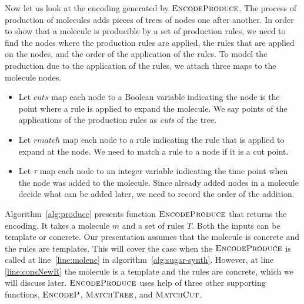 Now let us look at the encoding generated by $\textsc{EncodeProduce}$.
The process of production of molecules adds pieces of trees of nodes
one after another.
In order to show that a molecule is producible by a set of production rules,
we need to find the nodes where the production rules are applied,
the rules that are applied on the nodes, and
the order of the application of the rules.
To model the production due to the application of the rules,
we attach three maps to the molecule nodes.
\begin{itemize}
\item Let $cuts$ map each node to a Boolean variable
indicating the node is the point where a rule is applied to
expand the molecule.
We say points of the applications of the production
rules as {\em cuts} of the tree.

\item Let $rmatch$ map each node to a rule indicating
  the rule that is applied to expand at the node.
  We need to match a rule to a node if it is a cut point.
\item Let $\tau$ map each node to an integer variable
  indicating the time point when the node was added to the molecule.
  Since already added nodes in a molecule decide what can be added later,
  we need to record the order of the addition.
\end{itemize}

Algorithm~\ref{alg:produce} presents function $\textsc{EncodeProduce}$
that returns the encoding.
It takes a molecule $m$ and a set of rules $T$.
Both the inputs can be template or concrete.
Our presentation assumes that the molecule is concrete and
the rules are templates.
This will cover the case when the $\textsc{EncodeProduce}$ is called at
line~\ref{line:molenc} in algorithm~\ref{alg:sugar-synth}.
However, at line \ref{line:consNewR} the molecule is a template
and the rules are concrete, which we will discuss later.
$\textsc{EncodeProduce}$ uses help of three other supporting functions,
$\textsc{EncodeP}$, $\textsc{MatchTree}$, and $\textsc{MatchCut}$.
%

